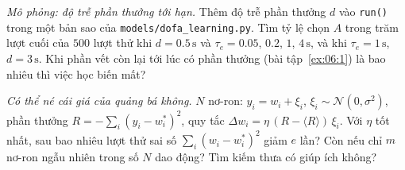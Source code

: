 \begin{exercise}[\lvlB]
\label{ex:06:7}
\emph{Mô phỏng: độ trễ phần thưởng tới hạn.} Thêm độ trễ phần thưởng $d$ vào \texttt{run()} trong một bản sao của \texttt{models/\allowbreak dofa\_learning.py}. Tìm tỷ lệ chọn $A$ trong trăm lượt cuối của $500$ lượt thử khi $d=0.5\,\text{s}$ và $\tau_e=0.05$, $0.2$, $1$, $4\,\text{s}$, và khi $\tau_e=1\,\text{s}$, $d=3\,\text{s}$. Khi phần vết còn lại tới lúc có phần thưởng (bài tập~\ref{ex:06:1}) là bao nhiêu thì việc học biến mất?
\end{exercise}

\begin{exercise}[\lvlC]
\label{ex:06:8}
\emph{Có thể né cái giá của quảng bá không.} $N$ nơ-ron: $y_i=w_i+\xi_i$, $\xi_i\sim\mathcal N(0,\sigma^2)$, phần thưởng $R=-\sum_i(y_i-w_i^*)^2$, quy tắc $\Delta w_i=\eta\,(R-\langle R\rangle)\,\xi_i$. Với $\eta$ tốt nhất, sau bao nhiêu lượt thử sai số $\sum_i(w_i-w_i^*)^2$ giảm $e$ lần? Còn nếu chỉ $m$ nơ-ron ngẫu nhiên trong số $N$ dao động? Tìm kiếm thưa có giúp ích không?
\end{exercise}
